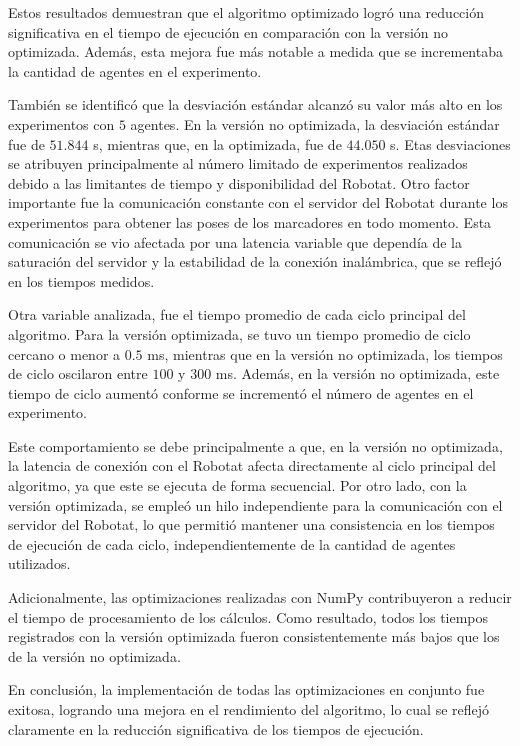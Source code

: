 Estos resultados demuestran que el algoritmo optimizado logró una reducción significativa en el tiempo de ejecución en comparación con la versión no optimizada. Además, esta mejora fue más notable a medida que se incrementaba la cantidad de agentes en el experimento.

También se identificó que la desviación estándar alcanzó su valor más alto en los experimentos con $5$ agentes. En la versión no optimizada, la desviación estándar fue de $51.844$ s, mientras que, en la optimizada, fue de $44.050$ s. Etas desviaciones se atribuyen principalmente al número limitado de experimentos realizados debido a las limitantes de tiempo y disponibilidad del Robotat. Otro factor importante fue la comunicación constante con el servidor del Robotat durante los experimentos para obtener las poses de los marcadores en todo momento. Esta comunicación se vio afectada por una latencia variable que dependía de la saturación del servidor y la estabilidad de la conexión inalámbrica, que se reflejó en los tiempos medidos.

Otra variable analizada, fue el tiempo promedio de cada ciclo principal del algoritmo. Para la versión optimizada, se tuvo un tiempo promedio de ciclo cercano o menor a $0.5$ ms, mientras que en la versión no optimizada, los tiempos de ciclo oscilaron entre $100$ y $300$ ms. Además, en la versión no optimizada, este tiempo de ciclo aumentó conforme se incrementó el número de agentes en el experimento.

Este comportamiento se debe principalmente a que, en la versión no optimizada, la latencia de conexión con el Robotat afecta directamente al ciclo principal del algoritmo, ya que este se ejecuta de forma secuencial. Por otro lado, con la versión optimizada, se empleó un hilo independiente para la comunicación con el servidor del Robotat, lo que permitió mantener una consistencia en los tiempos de ejecución de cada ciclo, independientemente de la cantidad de agentes utilizados. 

Adicionalmente, las optimizaciones realizadas con NumPy contribuyeron a reducir el tiempo de procesamiento de los cálculos. Como resultado, todos los tiempos registrados con la versión optimizada fueron consistentemente más bajos que los de la versión no optimizada.

En conclusión, la implementación de todas las optimizaciones en conjunto fue exitosa, logrando una mejora en el rendimiento del algoritmo, lo cual se reflejó claramente en la reducción significativa de los tiempos de ejecución.

